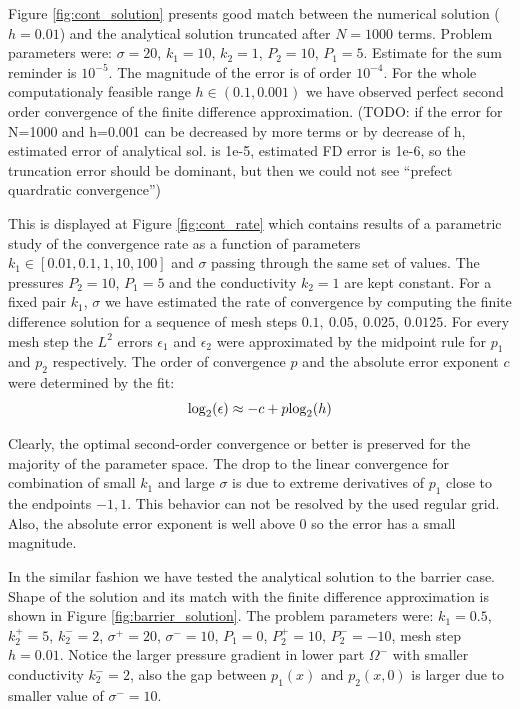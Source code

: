 \documentclass[sn-mathphys,Numbered]{sn-jnl}
\def\log{{\rm log}}
\begin{document}
Figure \ref{fig:cont_solution} presents good match between the numerical solution ($h=0.01$) and the analytical solution truncated after $N=1000$ terms. 
Problem parameters were: $\sigma=20$, $k_1=10$, $k_2=1$, $P_2=10$, $P_1=5$.
Estimate for the sum reminder is $10^{-5}$. The magnitude of the error is of order $10^{-4}$. For the whole computationaly feasible range $h\in (0.1, 0.001)$ 
we have observed perfect second order convergence of the finite difference approximation. (TODO: if the error for N=1000 and h=0.001 can be decreased by more terms or by decrease of h, 
estimated error of analytical sol. is 1e-5, estimated FD error is 1e-6, so the truncation error should be dominant, but then we could not see ``prefect quardratic convergence'')

This is displayed at Figure \ref{fig:cont_rate} which contains results of a parametric study of the 
convergence rate as a function of parameters $k_1 \in [0.01, 0.1, 1, 10, 100]$ and $\sigma$ passing through the same set of values. The pressures $P_2=10$, $P_1=5$
and the conductivity $k_2=1$ are kept constant. For a fixed pair $k_1$, $\sigma$ we have estimated the rate of convergence by computing the finite difference solution for a sequence  
of mesh steps $0.1,\ 0.05,\ 0.025,\ 0.0125$. For every mesh step the $L^2$ errors $\epsilon_1$ and $\epsilon_2$ were approximated by the midpoint rule 
for $p_1$ and $p_2$ respectively. The order of convergence $p$ and the absolute error exponent $c$ were determined by the fit:
\[
        \log_2(\epsilon) \approx -c + p\log_2(h) 
\]

Clearly, the optimal second-order convergence or better is preserved for the majority of the parameter space. The drop to the linear convergence for combination 
of small $k_1$ and large $\sigma$ is due to extreme derivatives of $p_1$ close to the endpoints ${-1, 1}$. This behavior can not be resolved by the used regular grid.
Also, the absolute error exponent is well above $0$ so the error has a small magnitude. 

In the similar fashion we have tested the analytical solution to the barrier case. Shape of the solution and its match with the finite difference approximation 
is shown in Figure \ref{fig:barrier_solution}. The problem parameters were: $k_1=0.5$, $k_2^+=5$, $k_2^-=2$, $\sigma^+=20$, $\sigma^-=10$, $P_1=0$, 
$P_2^+=10$, $P_2^-=-10$, mesh step $h=0.01$. Notice the larger pressure gradient in lower part $\Omega^-$ with smaller conductivity $k_2^- = 2$, also the gap between 
$p_1(x)$ and $p_2(x, 0)$ is larger due to smaller value of $\sigma^- = 10$. 
\end{document}
